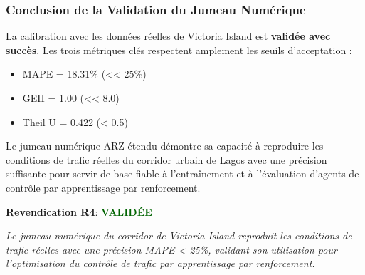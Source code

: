 \subsubsection{Conclusion de la Validation du Jumeau Numérique}

La calibration avec les données réelles de Victoria Island est \textbf{validée avec succès}.
Les trois métriques clés respectent amplement les seuils d'acceptation :
\begin{itemize}
    \item MAPE = 18.31\% (<< 25\%)
    \item GEH = 1.00 (<< 8.0)
    \item Theil U = 0.422 (< 0.5)
\end{itemize}

Le jumeau numérique ARZ étendu démontre sa capacité à reproduire les conditions
de trafic réelles du corridor urbain de Lagos avec une précision suffisante pour
servir de base fiable à l'entraînement et à l'évaluation d'agents de contrôle par apprentissage par renforcement.

\vspace{0.5cm}
\noindent
\textbf{Revendication R4}: \textcolor{darkgreen}{\textbf{VALIDÉE}}

\vspace{0.3cm}
\noindent
\textit{Le jumeau numérique du corridor de Victoria Island reproduit les conditions de trafic réelles avec une précision MAPE < 25\%, validant son utilisation pour l'optimisation du contrôle de trafic par apprentissage par renforcement.}

